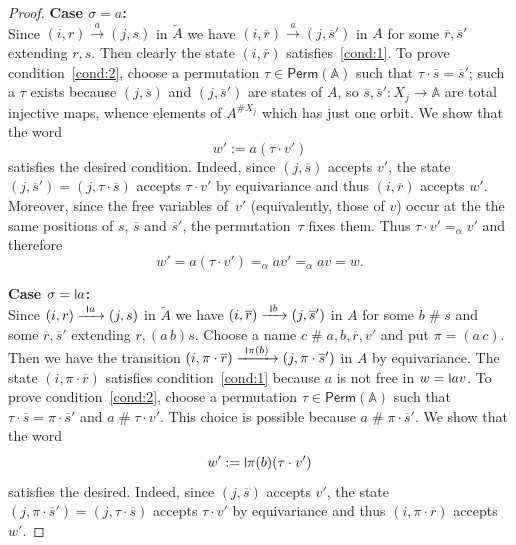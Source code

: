 \documentclass[10pt,a4paper]{amsart}
\newcommand{\midmid}{\hspace{0.2ex}{\rule[-0.1ex]{0.6pt}{1.65ex}}\hspace{0.2ex}}
\newcommand{\scriptmidmid}{\hspace{0.2ex}{\rule[-0.1ex]{0.6pt}{1.1ex}}\hspace{0.2ex}}
\newcommand{\newletter}[1]{{\midmid}#1}
\newcommand{\scriptnew}[1]{{\scriptmidmid}#1}
\numberwithin{equation}{section}
\newcommand{\ol}{\overline}
\newcommand{\xto}[1]{\xrightarrow{~#1~}}
\newcommand{\tl}{\widetilde}
\newcommand{\Perm}{\mathsf{Perm}}
\newcommand{\+}[1]{\mathcal{#1}\xspace}
\newcommand{\names}{\mathbb{A}}
\newcommand{\fresh}{\mathbin{\#}}
\theoremstyle{definition}
\begin{document}
\begin{proof}
  \smallskip\noindent\textbf{Case $\sigma=a$:} \\
  Since $(i,r)\xto{a} (j,s)$ in $\tl{A}$ we have
  $(i,\ol{r})\xto{a}(j,\ol{s}')$
  in $A$ for some
  $\ol{r}, \ol{s}'$ extending $r,s$. Then clearly the state
  $(i,\ol{r})$ satisfies~\ref{cond:1}. To prove condition~\ref{cond:2}, choose a
  permutation $\tau\in \Perm(\names)$ such that
  $\tau\cdot \ol{s}=\ol{s}'$; such a $\tau$ exists because
  $(j,\ol{s})$ and $(j,\ol{s}')$ are states of $A$, so
  $\ol{s},\ol{s}'\colon X_j\to \names$ are total injective maps,
  whence elements of $A^{\# X_j}$ which has just one orbit.
  We show that the word
  \[
    w':=a(\tau\cdot v')
  \]
  satisfies the desired condition. Indeed, since $(j,\ol{s})$ accepts
  $v'$, the state $(j,\ol{s}')=(j,\tau\cdot\ol{s})$ accepts
  $\tau\cdot v'$ by equivariance and thus $(i,\ol{r})$ accepts
  $w'$. Moreover, since the free variables of~$v'$ (equivalently,
  those of $v$) occur at the the same positions of $s$, $\ol{s}$ and
  $\ol{s}'$, the permutation~$\tau$ fixes them. Thus
  $\tau\cdot v' =_\alpha v'$ and therefore
  \[ w'=a(\tau\cdot v') =_\alpha av' =_\alpha av = w.\]

  \smallskip\noindent \textbf{Case $\sigma=\newletter a$:} \\
  Since $(i,r)\xto{\scriptnew a} (j,s)$ in $\tl{A}$ we have
  $(i,\ol{r})\xto{\scriptnew b}(j,\ol{s}')$ in $A$ for some
  $b\fresh s$ and some $\ol{r}, \ol{s}'$ extending $r,(a\,
  b)s$. Choose a name $c\fresh a,b,\ol{r},v'$ and put $\pi = (a\, c)$.
  Then we have the transition
  $(i,\pi\cdot \ol{r})\xto{\scriptnew \pi(b)} (j, \pi\cdot \ol{s}')$
  in ${A}$ by equivariance. The state $(i,\pi\cdot \ol{r})$ satisfies
  condition~\ref{cond:1} because $a$ is not free in $w=\newletter
  av$. To prove condition~\ref{cond:2}, choose a permutation
  $\tau\in \Perm(\names)$ such that
  $\tau\cdot \ol{s}=\pi \cdot \ol{s}'$ and $a\fresh \tau\cdot
  v'$. This choice is possible because $a\fresh \pi\cdot \ol{s}'$. We
  show that the word
  \[
    w':= \newletter \pi(b)(\tau\cdot v')
  \]
  satisfies the desired. Indeed, since $(j,\ol{s})$ accepts
  $v'$, the state $(j,\pi\cdot \ol{s}')=(j,\tau\cdot \ol{s})$
  accepts $\tau\cdot v'$ by equivariance and thus
  $(i,\pi\cdot \ol{r})$ accepts $w'$.


\end{proof}
\end{document}

